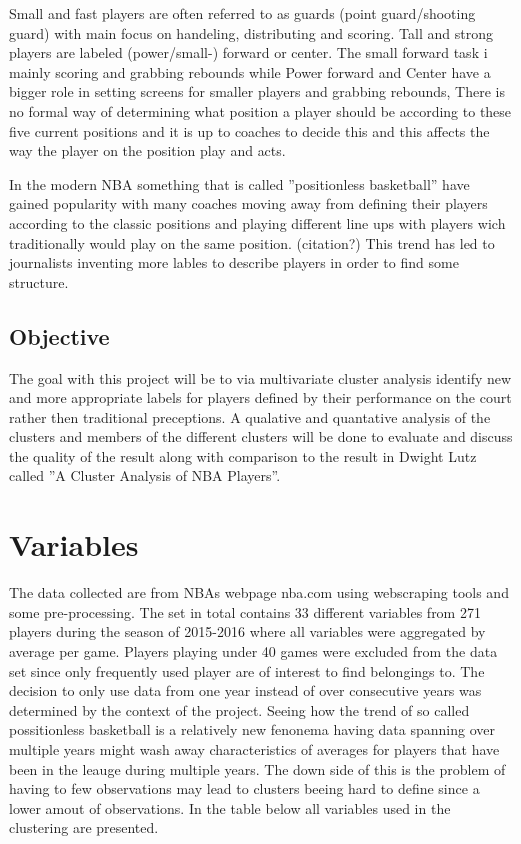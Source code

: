 \documentclass{article}
\begin{document}
Small and fast players are often referred to as guards (point guard/shooting guard) with main focus on handeling, distributing and scoring. Tall and strong players are labeled (power/small-) forward or center. The small forward task i mainly scoring and grabbing rebounds while Power forward and Center have a bigger role in setting screens for smaller players and grabbing rebounds,   There is no formal way of determining what position a player should be according to these five current positions and it is up to coaches to decide this and this affects the way the player on the position play and acts. 

In the modern NBA something that is called ”positionless basketball” have gained popularity with many coaches moving away from defining their players according to the classic positions and playing different line ups with players wich traditionally would play on the same position. (citation?) This trend has led to journalists inventing more lables to describe players in order to find some structure. 

\subsection{Objective}

The goal with this project will be to via multivariate cluster analysis identify new and  more appropriate labels for players defined by their performance on the court rather then traditional preceptions. A qualative and quantative analysis of the clusters and members of the different clusters will be done to evaluate and discuss the quality of the result along with comparison to the result in Dwight Lutz called  ”A Cluster Analysis of NBA Players”.  



\section{Variables}

The data collected are from NBAs webpage nba.com using webscraping tools and some pre-processing. The set in total contains 33 different variables from 271 players during the season of 2015-2016 where all variables were aggregated by average per game. Players playing under 40 games were excluded from the data set since only frequently used player are of interest to find belongings to.  The decision to only use data from one year instead of over consecutive years was determined by the context of the project. Seeing how the trend of so called possitionless basketball is a relatively new fenonema having data spanning over multiple years might wash away characteristics of averages for players that have been in the leauge during multiple years. The down side of this is the problem of having to few observations may lead to clusters beeing hard to define since a lower amout of observations. In the table below all variables used in the clustering are presented. 
\end{document}
